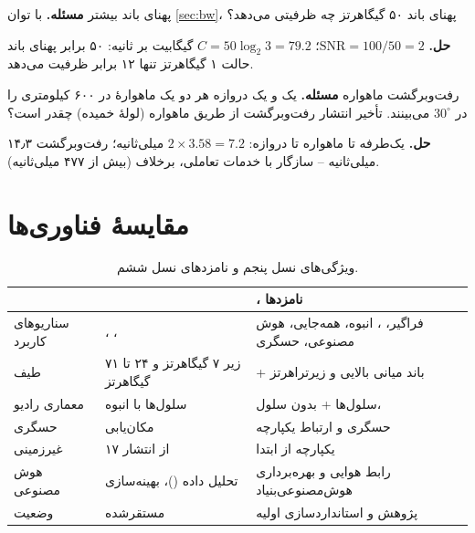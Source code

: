 \documentclass[11pt,a4paper]{article}
\begin{document}
\begin{examplebox}{پهنای باند بیشتر}\label{ex:bw}
\textbf{مسئله.} با توان \cref{sec:bw}، پهنای باند ۵۰ گیگاهرتز چه ظرفیتی می‌دهد؟

\textbf{حل.} $\mathrm{SNR} = 100/50 = 2$؛ $C = 50\log_2 3 = 79.2$ گیگابیت بر ثانیه: ۵۰ برابر پهنای باند حالت ۱ گیگاهرتز تنها ۱۲ برابر ظرفیت می‌دهد.
\end{examplebox}

\begin{examplebox}{رفت‌وبرگشت ماهواره}\label{ex:leo}
\textbf{مسئله.} یک  و یک دروازه هر دو یک ماهوارهٔ  در ۶۰۰ کیلومتری را در $30^\circ$ می‌بینند. تأخیر انتشار رفت‌وبرگشت از طریق ماهواره (لولهٔ خمیده) چقدر است؟

\textbf{حل.} یک‌طرفه  تا ماهواره تا دروازه: $2\times3.58 = 7.2$ میلی‌ثانیه؛ رفت‌وبرگشت ۱۴٫۳ میلی‌ثانیه -- سازگار با خدمات تعاملی، برخلاف  (بیش از
۴۷۷ میلی‌ثانیه).
\end{examplebox}

\section{مقایسهٔ فناوری‌ها}
\begin{table}[htbp]
\centering\small
\caption{ویژگی‌های نسل پنجم و نامزدهای نسل ششم.}\label{tab:cmp}
\begin{tabularx}{\linewidth}{@{}l Y Y@{}}
\toprule
{} &  & ، نامزدها \\
\midrule
سناریوهای کاربرد & ، ،  & فراگیر، ، انبوه، همه‌جایی، هوش مصنوعی، حسگری \\
طیف & زیر ۷ گیگاهرتز و ۲۴ تا ۷۱ گیگاهرتز & + باند میانی بالایی و زیرتراهرتز \\
معماری رادیو & سلول‌ها با  انبوه & سلول‌ها + بدون سلول،  \\
حسگری & مکان‌یابی & حسگری و ارتباط یکپارچه \\
غیرزمینی &  از انتشار ۱۷ & یکپارچه از ابتدا \\
هوش مصنوعی & تحلیل داده ()، بهینه‌سازی  & رابط هوایی و بهره‌برداری هوش‌مصنوعی‌بنیاد \\
وضعیت & مستقرشده & پژوهش و استانداردسازی اولیه \\
\bottomrule
\end{tabularx}
\end{table}
\end{document}
